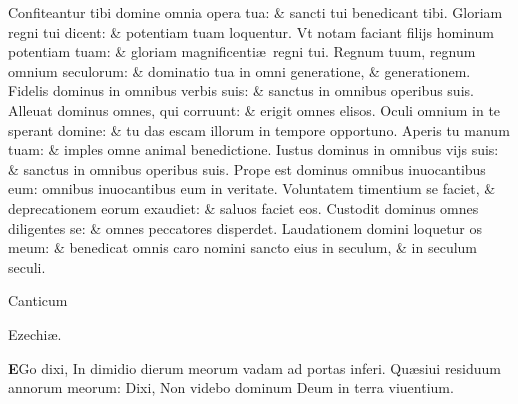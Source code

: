\documentclass[a5paper,10pt]{book}
\def\leftmarginnote{%
	\lrmarginnote{\hskip -\marginparsep \hskip -6.5em}}
\def\ae{æ}
\begin{document}
\begin{multicols*}{2}
\newline \color{red} C\color{black}onfiteantur tibi domine omnia opera tua: \& sancti tui benedicant tibi.
\newline \color{red} G\color{black}loriam regni tui dicent: \& potentiam tuam loquentur.
\newline \color{red} V\color{black}t notam faciant filijs hominum potentiam tuam: \& gloriam magnificenti\ae \ regni tui.
\newline \color{red} R\color{black}egnum tuum, regnum omnium seculorum: \& dominatio tua in omni generatione, \& generationem.
\newline \color{red} F\color{black}idelis dominus in omnibus verbis suis: \& sanctus in omnibus operibus suis.
\newline \color{red} A\color{black}lleuat dominus omnes, qui corruunt: \& erigit omnes elisos.
\newline \color{red} O\color{black}culi omnium in te sperant domine: \& tu das escam illorum in tempore opportuno.
\newline \color{red} A\color{black}peris tu manum tuam: \& imples omne animal benedictione.
\newline \color{red} I\color{black}ustus dominus in omnibus vijs suis: \& sanctus in omnibus operibus suis.
\newline \color{red} P\color{black}rope est dominus omnibus inuocantibus eum: omnibus inuocantibus eum in veritate.
\newline \color{red} V\color{black}oluntatem timentium se faciet, \& deprecationem eorum exaudiet: \& saluos faciet eos.
\newline \color{red} C\color{black}ustodit dominus omnes diligentes se: \& omnes peccatores disperdet.
\newline \color{red} L\color{black}audationem domini loquetur os meum: \& benedicat omnis caro nomini sancto eius in seculum, \& in seculum seculi.
\vspace{-1em}
\begin{center} \color{red}
\hypertarget{Ezekiel}{Canticum} Ezechi\ae .
\end{center}
\vspace{-1em}
\lettrine[lines=2]{\bfseries \color{red} E}{}Go dixi,\leftmarginnote{\begin{flushright}Isa.\\38.\end{flushright}} In dimidio dierum meorum vadam ad portas inferi.
\newline \color{red} Q\color{black}u\ae siui residuum annorum meorum: Dixi, Non videbo dominum Deum in terra viuentium.

\end{multicols*}
\end{document}

